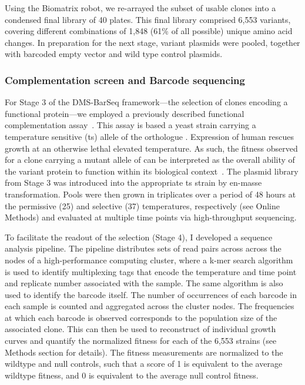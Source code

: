 Using the Biomatrix robot, we re-arrayed the subset of usable clones into a condensed final library of 40 plates. This final library comprised 6,553  variants, covering different combinations of 1,848 (61\% of all possible) unique amino acid changes. In preparation for the next stage, variant plasmids were pooled, together with barcoded empty vector and wild type control plasmids.



\subsubsection{Complementation screen and Barcode sequencing}

For Stage 3 of the DMS-BarSeq framework---the selection of clones encoding a functional protein---we employed a previously described  functional complementation assay~\cite{lee_complementation_1987,osborn_rescuing_2007}. This assay is based a yeast strain carrying a temperature sensitive (ts) allele of the  orthologue . Expression of human  rescues growth at an otherwise lethal elevated temperature. As such, the fitness observed for a clone carrying a mutant allele of  can be interpreted as the overall ability of the variant protein to function within its biological context~\cite{sun_extended_2016}. 
The plasmid library from Stage 3 was introduced into the appropriate ts strain by en-masse transformation. Pools were then grown in triplicates over a period of 48 hours at the permissive (25\celsius ) and selective (37\celsius ) temperatures, respectively (see Online Methods) and evaluated at multiple time points via high-throughput sequencing.

To facilitate the readout of the selection (Stage 4), I developed a sequence analysis pipeline. The pipeline distributes sets of read pairs across across the nodes of a high-performance computing cluster, where a k-mer search algorithm is used to identify multiplexing tags that encode the temperature and time point and replicate number associated with the sample. The same algorithm is also used to identify the barcode itself. The number of occurrences of each barcode in each sample is counted and aggregated across the cluster nodes. The frequencies at which each barcode is observed corresponds to the population size of the associated clone. This can then be used to reconstruct of individual growth curves and quantify the normalized fitness for each of the 6,553 strains (see Methods section for details). The fitness measurements are normalized to the wildtype and null controls, such that a score of 1 is equivalent to the average wildtype fitness, and 0 is equivalent to the average null control fitness.

